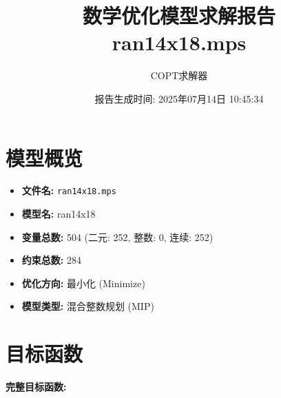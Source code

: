 \documentclass[a4paper,10pt]{article}
\title{数学优化模型求解报告\\{\large ran14x18.mps}}
\author{COPT求解器}
\date{报告生成时间: 2025年07月14日 10:45:34}
\begin{document}
\maketitle
\tableofcontents
\newpage

\section{模型概览}
\begin{itemize}
    \item \textbf{文件名:} \texttt{ran14x18.mps}
    \item \textbf{模型名:} ran14x18
    \item \textbf{变量总数:} 504 (二元: 252, 整数: 0, 连续: 252)
    \item \textbf{约束总数:} 284
    \item \textbf{优化方向:} 最小化 (Minimize)
    \item \textbf{模型类型:} 混合整数规划 (MIP)
\end{itemize}
\section{目标函数}

\textbf{完整目标函数:}
\end{document}
